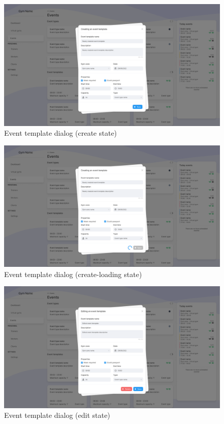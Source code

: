 \documentclass[a4paper, 12pt, oneside]{book}
\begin{document}
\begin{figure}[h!]
	\centering
	\includegraphics[width=\textwidth]{assets/ui/EventTemplateCreate.png}
	\caption{Event template dialog (create state)}
\end{figure}
\begin{figure}[h!]
	\centering
	\includegraphics[width=\textwidth]{assets/ui/EventTemplateCreateLoading.png}
	\caption{Event template dialog (create-loading state)}
\end{figure}
\begin{figure}[h!]
	\centering
	\includegraphics[width=\textwidth]{assets/ui/EventTemplateEdit.png}
	\caption{Event template dialog (edit state)}
\end{figure}
\end{document}

